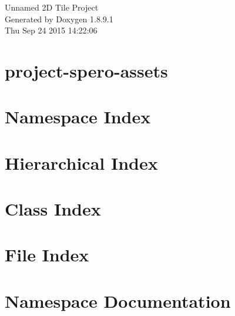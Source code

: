 \documentclass[twoside]{book}
\newcommand{\+}{\discretionary{\mbox{\scriptsize$\hookleftarrow$}}{}{}}
\newcommand{\clearemptydoublepage}{%
  \newpage{\pagestyle{empty}\cleardoublepage}%
}
\begin{document}
\hypersetup{pageanchor=false,
             bookmarks=true,
             bookmarksnumbered=true,
             pdfencoding=unicode
            }
\begin{titlepage}
\vspace*{7cm}
\begin{center}%
{\Large Unnamed 2\+D Tile Project }\\
\vspace*{1cm}
{\large Generated by Doxygen 1.8.9.1}\\
\vspace*{0.5cm}
{\small Thu Sep 24 2015 14:22:06}\\
\end{center}
\end{titlepage}
\clearemptydoublepage
\tableofcontents
\clearemptydoublepage
{}
\hypersetup{pageanchor=true}

\chapter{project-\/spero-\/assets}
\label{md_project-spero-assets__r_e_a_d_m_e}
\hypertarget{md_project-spero-assets__r_e_a_d_m_e}{}

\chapter{Namespace Index}

\chapter{Hierarchical Index}

\chapter{Class Index}

\chapter{File Index}

\chapter{Namespace Documentation}





\end{document}
